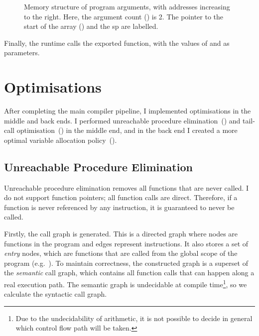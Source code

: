 \documentclass[00-main.tex]{subfiles}
\begin{document}
\begin{figure}[t]
  \centering
  \caption{\protect{}%
    Memory structure of program arguments, with addresses increasing to the right. Here, the argument count () is 2.
    The pointer to the start of the array () and the \gls{sp} are labelled.
  }%
  \label{fig:program args memory structure}
\end{figure}

Finally, the runtime calls the exported  function, with the values of  and  as parameters.

\section{Optimisations}\label{sec:impl:optimisations}

After completing the main compiler pipeline, I implemented optimisations in the middle and back ends.
I performed unreachable procedure elimination~() and tail-call optimisation~() in the middle end, and in the back end I created a more optimal variable allocation policy~().

\subsection{Unreachable Procedure Elimination}\label{sec:impl:unreachable procedure elimination}

Unreachable procedure elimination removes all functions that are never called.
I do not support function pointers; all function calls are direct.
Therefore, if a function is never referenced by any  instruction, it is guaranteed to never be called.

Firstly, the call graph is generated.
This is a directed graph where nodes are functions in the program and edges represent  instructions.
It also stores a set of \emph{entry} nodes, which are functions that are called from the global scope of the program (e.g.~). %
To maintain correctness, the constructed graph is a superset of the \emph{semantic} call graph, which contains all function calls that can happen along a real execution path.
The semantic graph is undecidable at compile time\footnote{Due to the undecidability of arithmetic, it is not possible to decide in general which control flow path will be taken.}, so we calculate the syntactic call graph.
\end{document}
